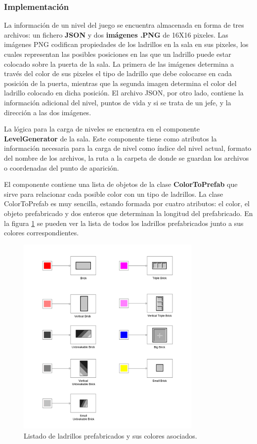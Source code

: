 \subsubsection{Implementación}
La información de un nivel del juego se encuentra almacenada en forma de tres archivos: un fichero \textbf{JSON} y dos \textbf{imágenes .PNG} de 16X16 pixeles. Las imágenes PNG codifican propiedades de los ladrillos en la sala en sus pixeles, los cuales representan las posibles posiciones en las que un ladrillo puede estar colocado sobre la puerta de la sala. La primera de las imágenes determina a través del color de sus pixeles el tipo de ladrillo que debe colocarse en cada posición de la puerta, mientras que la segunda imagen determina el color del ladrillo colocado en dicha posición.
El archivo JSON, por otro lado, contiene la información adicional del nivel, puntos de vida y si se trata de un jefe, y la dirección a las dos imágenes. 

La lógica para la carga de niveles se encuentra en el componente \textbf{LevelGenerator} de la sala. Este componente tiene como atributos la información necesaria para la carga de nivel como índice del nivel actual, formato del nombre de los archivos, la ruta a la carpeta de donde se guardan los archivos o coordenadas del punto de aparición. 

El componente contiene una lista de objetos de la clase \textbf{ColorToPrefab} que sirve para relacionar cada posible color con un tipo de ladrillos. La clase ColorToPrefab es muy sencilla, estando formada por cuatro atributos: el color, el objeto prefabricado y dos enteros que determinan la longitud del prefabricado. En la figura \ref{prefab_color} se pueden ver la lista de todos los ladrillos prefabricados junto a sus colores correspondientes.
\begin{figure}[h]
	\includegraphics[width=0.8\textwidth]{images/estructura/niveles/prefab_colors}
	\centering
	\caption{Listado de ladrillos prefabricados y sus colores asociados.}
	\label{prefab_color}
\end{figure}


